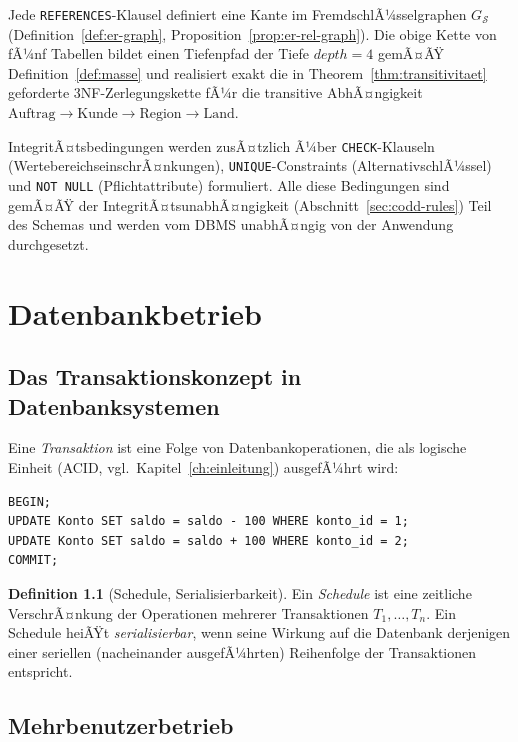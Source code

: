 ﻿\documentclass[a4paper,12pt]{report}
\theoremstyle{definition}
\newtheorem{definition}{Definition}[chapter]
\theoremstyle{remark}
\newcommand{\depth}{\mathit{depth}}
\begin{document}
Jede \texttt{REFERENCES}-Klausel definiert eine Kante im
FremdschlÃ¼sselgraphen $G_{\mathcal{S}}$ (Definition~\ref{def:er-graph},
Proposition~\ref{prop:er-rel-graph}). Die obige Kette von fÃ¼nf
Tabellen bildet einen Tiefenpfad der Tiefe $\depth=4$ gemÃ¤ÃŸ
Definition~\ref{def:masse} und realisiert exakt die in
Theorem~\ref{thm:transitivitaet} geforderte 3NF-Zerlegungskette fÃ¼r die
transitive AbhÃ¤ngigkeit $\text{Auftrag} \to \text{Kunde} \to
\text{Region} \to \text{Land}$.

IntegritÃ¤tsbedingungen werden zusÃ¤tzlich Ã¼ber \texttt{CHECK}-Klauseln
(WertebereichseinschrÃ¤nkungen), \texttt{UNIQUE}-Constraints
(AlternativschlÃ¼ssel) und \texttt{NOT NULL} (Pflichtattribute)
formuliert. Alle diese Bedingungen sind gemÃ¤ÃŸ der
IntegritÃ¤tsunabhÃ¤ngigkeit (Abschnitt~\ref{sec:codd-rules}) Teil des
Schemas und werden vom DBMS unabhÃ¤ngig von der Anwendung durchgesetzt.

\chapter{Datenbankbetrieb}
\label{ch:betrieb}

\section{Das Transaktionskonzept in Datenbanksystemen}

Eine \emph{Transaktion} ist eine Folge von Datenbankoperationen, die als
logische Einheit (ACID, vgl.\ Kapitel~\ref{ch:einleitung}) ausgefÃ¼hrt
wird:

\begin{lstlisting}
BEGIN;
UPDATE Konto SET saldo = saldo - 100 WHERE konto_id = 1;
UPDATE Konto SET saldo = saldo + 100 WHERE konto_id = 2;
COMMIT;
\end{lstlisting}

\begin{definition}[Schedule, Serialisierbarkeit]
Ein \emph{Schedule} ist eine zeitliche VerschrÃ¤nkung der Operationen
mehrerer Transaktionen $T_1,\ldots,T_n$. Ein Schedule heiÃŸt
\emph{serialisierbar}, wenn seine Wirkung auf die Datenbank derjenigen
einer seriellen (nacheinander ausgefÃ¼hrten) Reihenfolge der
Transaktionen entspricht.
\end{definition}

\section{Mehrbenutzerbetrieb}
\end{document}
